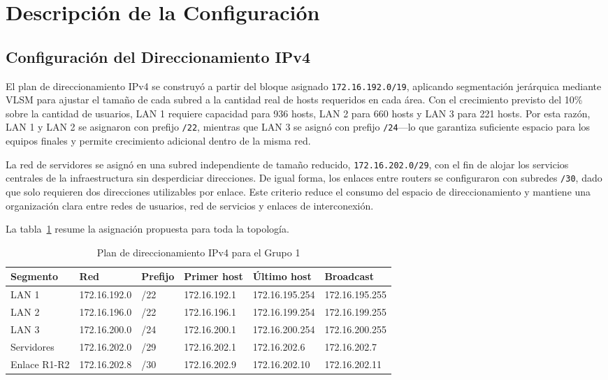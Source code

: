 \section{Descripción de la Configuración}

\subsection{Configuración del Direccionamiento IPv4}

El plan de direccionamiento IPv4 se construyó a partir del bloque asignado
\texttt{172.16.192.0/19}, aplicando segmentación jerárquica mediante VLSM para
ajustar el tamaño de cada subred a la cantidad real de hosts requeridos en cada
área. Con el crecimiento previsto del 10\% sobre la cantidad de usuarios, LAN 1
requiere capacidad para 936 hosts, LAN 2 para 660 hosts y LAN 3 para 221 hosts.
Por esta razón, LAN 1 y LAN 2 se asignaron con prefijo \texttt{/22}, mientras que
LAN 3 se asignó con prefijo \texttt{/24}—lo que garantiza suficiente espacio
para los equipos finales y permite crecimiento adicional dentro de la misma red.

La red de servidores se asignó en una subred independiente de tamaño reducido,
\texttt{172.16.202.0/29}, con el fin de alojar los servicios centrales de la
infraestructura sin desperdiciar direcciones. De igual forma, los enlaces entre
routers se configuraron con subredes \texttt{/30}, dado que solo requieren dos
direcciones utilizables por enlace. Este criterio reduce el consumo del espacio
de direccionamiento y mantiene una organización clara entre redes de usuarios,
red de servicios y enlaces de interconexión.

La tabla~\ref{tab:ipv4} resume la asignación propuesta para toda la topología.

\begin{table}[H]
\centering
\caption{Plan de direccionamiento IPv4 para el Grupo 1}
\label{tab:ipv4}
\begin{tabularx}{\textwidth}{l l l l l l}
\toprule
Segmento & Red & Prefijo & Primer host & Último host & Broadcast \\
\midrule
LAN 1 & 172.16.192.0 & /22 & 172.16.192.1 & 172.16.195.254 & 172.16.195.255 \\
LAN 2 & 172.16.196.0 & /22 & 172.16.196.1 & 172.16.199.254 & 172.16.199.255 \\
LAN 3 & 172.16.200.0 & /24 & 172.16.200.1 & 172.16.200.254 & 172.16.200.255 \\
Servidores & 172.16.202.0 & /29 & 172.16.202.1 & 172.16.202.6 & 172.16.202.7 \\
Enlace R1-R2 & 172.16.202.8 & /30 & 172.16.202.9 & 172.16.202.10 & 172.16.202.11 \\
\bottomrule
\end{tabularx}
\end{table}

